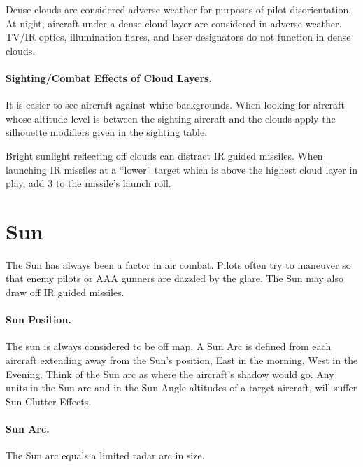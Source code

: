 \begin{advancedrules}
Dense clouds are considered adverse weather for purposes of pilot disorientation. At night, aircraft under a dense cloud layer are considered in adverse weather. TV/IR optics, illumination flares, and laser designators do not function in dense clouds.

\paragraph{Sighting/Combat Effects of Cloud Layers.} It is easier to see aircraft against white backgrounds. When looking for aircraft whose altitude level is between the sighting aircraft and the clouds apply the silhouette modifiers given in the sighting table.

Bright sunlight reflecting off clouds can distract IR guided missiles. When launching IR missiles at a “lower” target which is above the highest cloud layer in play, add 3 to the missile's launch roll.


\section{Sun}
\label{rule:sun}

The Sun has always been a factor in air combat. Pilots often try to maneuver so that enemy pilots or AAA gunners are dazzled by the glare. The Sun may also draw off IR guided missiles.

\paragraph{Sun Position.} The sun is always considered to be off map. A Sun Arc is defined from each aircraft extending away from the Sun's position, East in the morning, West in the Evening. Think of the Sun arc as where the aircraft's shadow would go. Any units in the Sun arc and in the Sun Angle altitudes of a target aircraft, will suffer Sun Clutter Effects.

\paragraph{Sun Arc.} The Sun arc equals a limited radar arc in size. 



\end{advancedrules}
